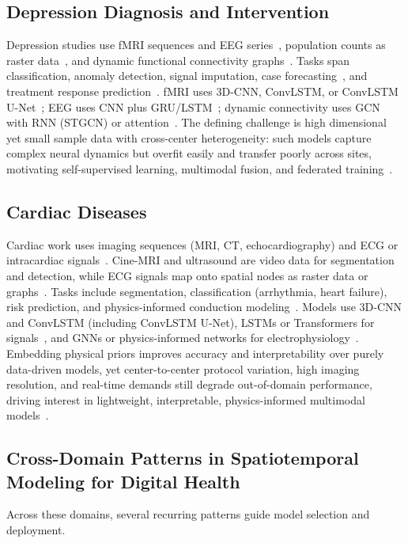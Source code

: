 \documentclass[journal]{IEEEtran}
\begin{document}
\subsection{Depression Diagnosis and Intervention}
Depression studies use fMRI sequences and EEG series~\cite{2,4}, population counts as raster data~\cite{3}, and dynamic functional connectivity graphs~\cite{4,9}. Tasks span classification, anomaly detection, signal imputation, case forecasting~\cite{3}, and treatment response prediction~\cite{4}. fMRI uses 3D-CNN, ConvLSTM, or ConvLSTM U-Net~\cite{9}; EEG uses CNN plus GRU/LSTM~\cite{2}; dynamic connectivity uses GCN with RNN (STGCN) or attention~\cite{4}. The defining challenge is high dimensional yet small sample data with cross-center heterogeneity: such models capture complex neural dynamics but overfit easily and transfer poorly across sites, motivating self-supervised learning, multimodal fusion, and federated training~\cite{9}.

\subsection{Cardiac Diseases}
Cardiac work uses imaging sequences (MRI, CT, echocardiography) and ECG or intracardiac signals~\cite{5,6,7}. Cine-MRI and ultrasound are video data for segmentation and detection, while ECG signals map onto spatial nodes as raster data or graphs~\cite{7}. Tasks include segmentation, classification (arrhythmia, heart failure), risk prediction, and physics-informed conduction modeling~\cite{7}. Models use 3D-CNN and ConvLSTM (including ConvLSTM U-Net), LSTMs or Transformers for signals~\cite{5,6}, and GNNs or physics-informed networks for electrophysiology~\cite{7}. Embedding physical priors improves accuracy and interpretability over purely data-driven models, yet center-to-center protocol variation, high imaging resolution, and real-time demands still degrade out-of-domain performance, driving interest in lightweight, interpretable, physics-informed multimodal models~\cite{6}.

\subsection{Cross-Domain Patterns in Spatiotemporal Modeling for Digital Health}
Across these domains, several recurring patterns guide model selection and deployment.
\end{document}
